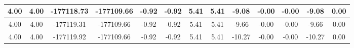 \begin{table}[htbp]
\begin{adjustbox}{angle=90}
\begin{tabular}{|c|c|c|c|c|c|c|c|c|c|c|c|c|}
 4.00 & 4.00 & -177118.73 & -177109.66 & -0.92 & -0.92 & 5.41 & 5.41 & -9.08 & -0.00 & -0.00 & -9.08 & 0.00\\ \hline
 4.00 & 4.00 & -177119.31 & -177109.66 & -0.92 & -0.92 & 5.41 & 5.41 & -9.66 & -0.00 & -0.00 & -9.66 & 0.00\\ \hline
 4.00 & 4.00 & -177119.92 & -177109.66 & -0.92 & -0.92 & 5.41 & 5.41 & -10.27 & -0.00 & -0.00 & -10.27 & 0.00\\ \hline
            \end{tabular}
        \end{adjustbox}
        \caption{}
        \label{}
    \end{table}
    